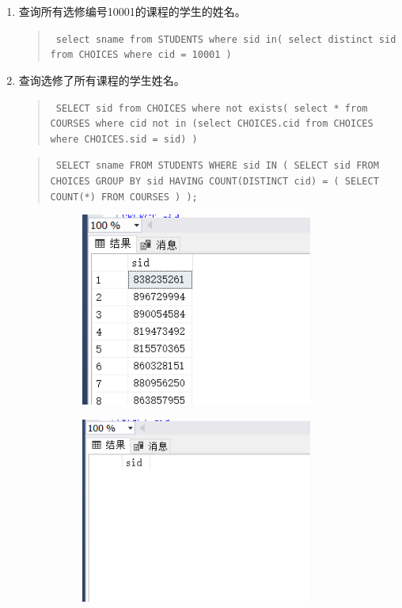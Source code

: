 \documentclass[a4paper,twoside]{article}
\begin{document}
\begin{spacing}{1.2}
\begin{enumerate}
\item 查询所有选修编号10001的课程的学生的姓名。
\begin{quote}
\texttt{
select sname from STUDENTS where sid in(
select distinct sid from CHOICES where cid = 10001
)
}
\end{quote}
\item 查询选修了所有课程的学生姓名。
\begin{quote}
\texttt{
SELECT sid from CHOICES 
where not exists(
select * from COURSES where
cid not in (select CHOICES.cid from CHOICES where CHOICES.sid = sid)
)
}
\end{quote}
\begin{quote}
\texttt{
SELECT sname
FROM STUDENTS
WHERE sid IN (
  SELECT sid
  FROM CHOICES
  GROUP BY sid
  HAVING COUNT(DISTINCT cid) = (
    SELECT COUNT(*) FROM COURSES
  )
);
}
\end{quote}

\begin{figure}[h]
\centering
\caption{运行结果}
\begin{subfigure}{0.3\textwidth}
  \includegraphics[width=0.9\textwidth]{fig25.png}
\end{subfigure}
\begin{subfigure}{0.3\textwidth}
  \includegraphics[width=0.9\textwidth]{fig26.png}
\end{subfigure}
\end{figure}


\end{enumerate}
\end{spacing}
\end{document}
